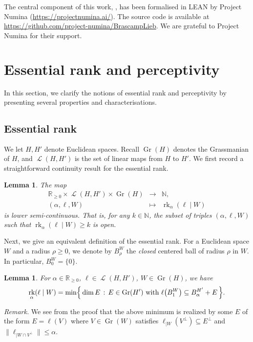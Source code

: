 \documentclass[a4paper,english]{amsart}
\newtheorem{lemma}[thm]{Lemma}
\theoremstyle{definition}
\newenvironment{remark}{\par\medskip \noindent \textit{Remark.} \rmfamily}{\medskip}
\newcommand{\N}{\mathbb{N}}
\newcommand{\R}{\mathbb{R}}
\newcommand{\1}{\mathbbm{1}}
\DeclareMathOperator{\Ell}{\mathscr{L}}
\DeclareMathOperator{\Span}{Span}
\DeclareMathOperator{\rk}{rk}
\newcommand{\setBig}[1]{\Bigl\{\, #1 \,\Bigr\}}
\DeclareMathOperator{\Gr}{Gr}
\begin{document}
\bigskip
{}
The central component of this work, , has been formalised in LEAN by Project Numina (\url{https://projectnumina.ai/}).
The source code is available  at \url{https://github.com/project-numina/BrascampLieb}.
We are grateful to Project Numina for their  support.

\section{Essential rank and perceptivity} \label{Sec-carac-rank-percep}

In this section, we clarify the notions of essential rank and perceptivity by presenting several properties and characterisations.

\subsection{Essential rank}

\bigskip
We let $H, H'$ denote Euclidean spaces. Recall $\Gr(H)$ denotes the Grassmanian of $H$, and $\Ell(H,H')$ is the set of linear maps from $H$ to $H'$.
We first record a straightforward continuity result for the essential rank.
\begin{lemma}
\label{lm-rank-cont}
The map
\[
\begin{array}{ccc}
\R_{\geq 0} \times \Ell(H,H') \times \Gr(H) & \to & \N,\\
(\alpha, \ell, W) & \mapsto & \rk_\alpha(\ell \mid W)
\end{array}
\]
is lower semi-continuous.
That is, for any $k \in \N$, the subset of triples $(\alpha, \ell, W)$ such that $\rk_\alpha(\ell \mid W) \geq k$ is open.
\end{lemma}

Next, we give an equivalent definition of the essential rank.
For a Euclidean space $W$ and a radius $\rho \geq 0$, we denote by $B_\rho^W$ the \emph{closed} centered ball of radius $\rho$ in $W$.
In particular, $B^W_0 = \{0\}$.
\begin{lemma}
\label{lm:arank}
For $\alpha \in \R_{\geq 0}$, $\ell \in \Ell(H,H')$,  $W \in \Gr(H)$, we have
\[
\rk_{\alpha}(\ell \mid W) = \min \setBig{\dim E \,:\, E \in \Gr(H') \text{ with } \ell \bigl(B^W_1\bigr) \subseteq B^{H'}_\alpha + E}.
\]
\end{lemma}
\begin{remark}
We see from the proof that the above minimum is realized by some $E$ of the form $E=\ell(V)$ where $V\in\Gr(W)$ satisfies $\ell_{|W}(V^\perp)\subseteq E^\perp$ and $\|\ell_{|W\cap V^\perp}\|\leq \alpha$.
\end{remark}
\end{document}
